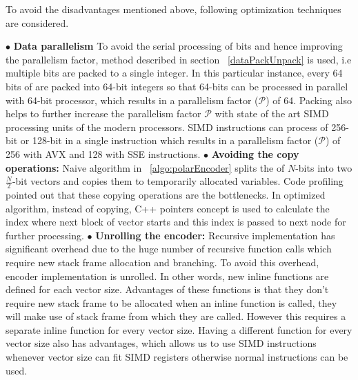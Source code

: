 To avoid the disadvantages mentioned above, following optimization techniques are considered.

$\bullet$ \textbf{Data parallelism} To avoid the serial processing of bits and hence improving the parallelism factor, method described in section ~\ref{dataPackUnpack} is used, i.e multiple bits are packed to a single integer. In this particular instance, every 64 bits of are packed into 64-bit integers so that 64-bits can be processed in parallel with 64-bit processor, which results in a parallelism factor ($\mathcal{P}$) of 64. Packing also helps to further increase the parallelism factor $\mathcal{P}$ with state of the art SIMD processing units of the modern processors. SIMD instructions can process of 256-bit or 128-bit in a single instruction which results in a parallelism factor ($\mathcal{P}$) of 256 with AVX and 128 with SSE instructions. \newline
\newline
$\bullet$ \textbf{Avoiding the copy operations:} Naive algorithm in ~\ref{algo:polarEncoder} splits the of $N$-bits into two $\frac{N}{2}$-bit vectors and copies them to temporarily allocated variables. Code profiling pointed out that these copying operations are the bottlenecks. In optimized algorithm, instead of copying, C++ pointers concept is used to calculate the index where next block of vector starts and this index is passed to next node for further processing. \newline
\newline
$\bullet$ \textbf{Unrolling the encoder:} Recursive implementation has significant overhead due to the huge number of recursive function calls which require new stack frame allocation and branching. To avoid this overhead, encoder implementation is unrolled. In other words, new inline functions are defined for each vector size. Advantages of these functions is that they don't require new stack frame to be allocated when an inline function is called, they will make use of stack frame from which they are called. However this requires a separate inline function for every vector size. Having a different function for every vector size also has advantages, which allows us to use SIMD instructions whenever vector size can fit SIMD registers otherwise normal instructions can be used. \newline
\newline
